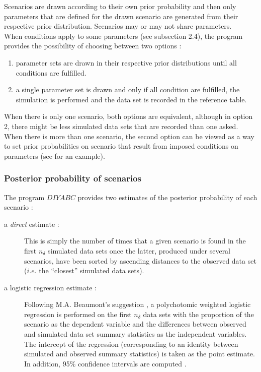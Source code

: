 Scenarios are drawn according to their own prior probability and then only parameters that are defined for the drawn scenario are generated from their respective prior distribution. Scenarios may or may not share parameters.\\
When conditions apply to some parameters (see subsection 2.4), the program provides the possibility of choosing between two options :
\begin{enumerate}
\item parameter sets are drawn in their respective prior distributions until all conditions are fulfilled.
\item a single parameter set is drawn and only if all condition are fulfilled, the simulation is performed and the data set is recorded in the reference table.
\end{enumerate}
When there is only one scenario, both options are equivalent, although in option 2, there might be less simulated data sets that are recorded than one asked. When there is more than one scenario, the second option can be viewed as a way to set prior probabilities on scenario that result from imposed conditions on parameters (see \citet{ME2005} for an example).  

\subsubsection{Posterior probability of scenarios}
The program $DIYABC$ provides two estimates of the posterior probability of each scenario :
\begin{description} 
\item[a \emph{direct}  estimate :] This is simply the number of times that a given scenario is found in the first $n_{\delta}$ simulated data sets once the latter, produced under several scenarios, have been sorted by ascending distances to the observed data set ($i.e.$ the ``closest'' simulated data sets).\\
\item[a logistic regression estimate :] Following M.A. Beaumont's suggestion \citep{FR2007,B2008}, a polychotomic weighted logistic regression is performed on the first  $n_{\delta}$ data sets with the proportion of the scenario as the dependent variable and the differences between observed and simulated data set summary statistics as the independent variables. The intercept of the regression (corresponding to an identity between simulated and observed summary statistics) is taken as the point estimate. In addition, 95\% confidence intervals are computed \citep{C2008}. 
\end{description} 

